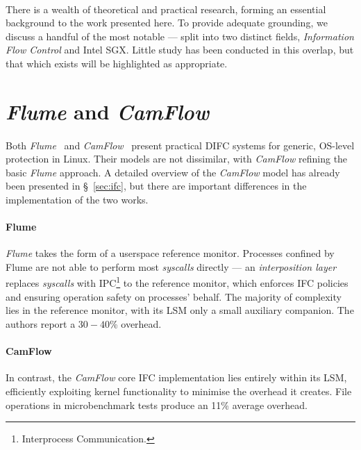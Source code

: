 \paragraph{} There is a wealth of theoretical and practical research, forming an essential background to the work presented here. To provide adequate grounding, we discuss a handful of the most notable --- split into two distinct fields, \textit{Information Flow Control} and Intel SGX. Little study has been conducted in this overlap, but that which exists will be highlighted as appropriate.


\section{\textit{Flume} and \textit{CamFlow}}

\paragraph{} Both \textit{Flume}~\cite{flume} and \textit{CamFlow}~\cite{camflow} present practical DIFC systems for generic, OS-level protection in Linux. Their models are not dissimilar, with \textit{CamFlow} refining the basic \textit{Flume} approach. A detailed overview of the \textit{CamFlow} model has already been presented in §~\ref{sec:ifc}, but there are important differences in the implementation of the two works.

\paragraph{Flume} \textit{Flume} takes the form of a userspace reference monitor. Processes confined by Flume are not able to perform most \textit{syscalls} directly --- an \textit{interposition layer} replaces \textit{syscalls} with IPC\footnote{Interprocess Communication.} to the reference monitor, which enforces IFC policies and ensuring operation safety on processes' behalf. The majority of complexity lies in the reference monitor, with its LSM only a small auxiliary companion. The authors report a $30-40$\% overhead.

\paragraph{CamFlow} In contrast, the \textit{CamFlow} core IFC implementation lies entirely within its LSM, efficiently exploiting kernel functionality to minimise the overhead it creates. File operations in microbenchmark tests produce an 11\% average overhead.



